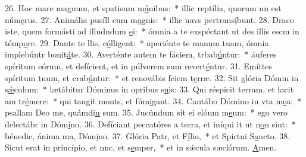 26. Hoc mare magnum, et spatisum m\uline{á}nibus:~* illic reptília, quorum nn est núm\uline{e}rus.
27. Animália pusíll cum m\uline{a}gnis:~* illic navs pertrans\uline{í}bunt.
28. Draco iste, quem formásti ad illudndum \uline{e}i:~* ómnia a te exspéctant ut des illis escm in témp\uline{o}re.
29. Dante te llis, c\uline{ó}lligent:~* aperiénte te manum tuam, ómnia implebúntr bonit\uline{á}te.
30. Averténte autem te fáciem, trbab\uline{ú}ntur:~* áuferes spíritum eórum, et defícient, et in púlverem sum revert\uline{é}ntur.
31. Emíttes spíritum tuum, et crab\uline{ú}ntur:~* et renovábis fciem t\uline{e}rræ.
32. Sit glória Dómin in s\uline{ǽ}culum:~* lætábitur Dóminus in opribus s\uline{u}is:
33. Qui réspicit terram, et facit am tr\uline{é}mere:~* qui tangit monts, et fúm\uline{i}gant.
34. Cantábo Dómino in vta m\uline{e}a:~* psallam Deo me, quámdi\uline{u} sum.
35. Jucúndum sit ei elóum m\uline{e}um:~* ego vero delectábr in Dóm\uline{i}no.
36. Defíciant peccatóres a terra, et iníqui it ut n\uline{o}n sint:~* bénedic, ánima ma, Dóm\uline{i}no.
37. Glória Patr, et F\uline{í}lio,~* et Spirtui S\uline{a}ncto.
38. Sicut erat in princípio, et nnc, et s\uline{e}mper,~* et in sǽcula sæclórum. \uline{A}men.
